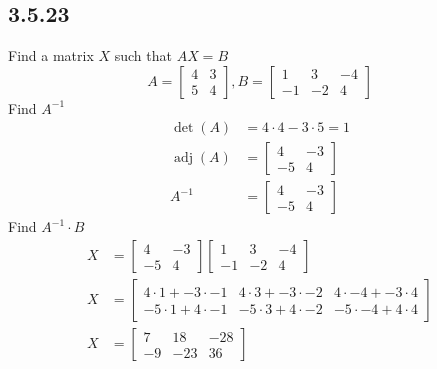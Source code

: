 \documentclass{article}
\DeclareMathOperator{\adj}{adj}
\begin{document}
\subsection{3.5.23}
Find a matrix $ X $ such that $ AX = B $
\begin{equation*}
	A =
		\begin{bmatrix}
			4 & 3 \\
			5 & 4
		\end{bmatrix},
	B =
		\begin{bmatrix}
			1 & 3 & -4 \\
			-1 & -2 & 4
		\end{bmatrix}
\end{equation*}
Find $ A^{-1} $
\begin{align*}
	\det(A) & = 4 \cdot 4 - 3 \cdot 5 = 1 \\
	\adj(A) & =
		\begin{bmatrix}
			4 & -3 \\
			-5 & 4
		\end{bmatrix} \\
	A^{-1} & =
		\begin{bmatrix}
			4 & -3 \\
			-5 & 4
		\end{bmatrix}
\end{align*}
Find $ A^{-1} \cdot B $
\begin{align*}
	X & =
		\begin{bmatrix}
			4 & -3 \\
			-5 & 4
		\end{bmatrix}
		\begin{bmatrix}
			1 & 3 & -4 \\
			-1 & -2 & 4
		\end{bmatrix} \\
	X & =
		\begin{bmatrix}
			4 \cdot 1 + -3 \cdot -1 & 4 \cdot 3 + -3 \cdot -2 & 4 \cdot -4 + -3 \cdot 4 \\
			-5 \cdot 1 + 4 \cdot -1 & -5 \cdot 3 + 4 \cdot -2 & -5 \cdot -4 + 4 \cdot 4
		\end{bmatrix} \\
	X & =
		\begin{bmatrix}
			7 & 18 & -28 \\
			-9 & -23 & 36
		\end{bmatrix}
\end{align*}
\end{document}
